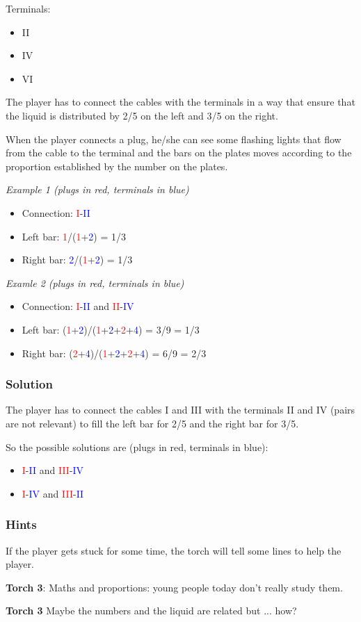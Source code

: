 Terminals:
\begin{itemize}
	\item II
	\item IV
	\item VI
\end{itemize}

The player has to connect the cables with the terminals in a way that ensure that the liquid is distributed by 2/5 on the left and 3/5 on the right.

When the player connects a plug, he/she can see some flashing lights that flow from the cable to the terminal and the bars on the plates moves according to the proportion established by the number on the plates.

\textit{Example 1 (plugs in red, terminals in blue)}
\begin{itemize}
	\item Connection: \textcolor{red}{I}-\textcolor{blue}{II}
	\item Left bar: \textcolor{red}{1}/(\textcolor{red}{1}+\textcolor{blue}{2}) = 1/3
	\item Right bar: \textcolor{blue}{2}/(\textcolor{red}{1}+\textcolor{blue}{2}) = 1/3
\end{itemize}

\textit{Examle 2 (plugs in red, terminals in blue)}
\begin{itemize}
	\item Connection: \textcolor{red}{I}-\textcolor{blue}{II} and \textcolor{red}{II}-\textcolor{blue}{IV}
	\item Left bar: (\textcolor{red}{1}+\textcolor{blue}{2})/(\textcolor{red}{1}+\textcolor{blue}{2}+\textcolor{red}{2}+\textcolor{blue}{4}) = 3/9 = 1/3
	\item Right bar: (\textcolor{red}{2}+\textcolor{blue}{4})/(\textcolor{red}{1}+\textcolor{blue}{2}+\textcolor{red}{2}+\textcolor{blue}{4}) = 6/9 = 2/3
\end{itemize}

\subsubsection*{Solution}
The player has to connect the cables I and III with the terminals II and IV (pairs are not relevant) to fill the left bar for 2/5 and the right bar for 3/5.

So the possible solutions are (plugs in red, terminals in blue):
\begin{itemize}
	\item \textcolor{red}{I}-\textcolor{blue}{II} and \textcolor{red}{III}-\textcolor{blue}{IV}
	\item \textcolor{red}{I}-\textcolor{blue}{IV} and \textcolor{red}{III}-\textcolor{blue}{II}
\end{itemize}

\subsubsection*{Hints}
If the player gets stuck for some time, the torch will tell some lines to help the player.

\textbf{Torch 3}: Maths and proportions: young people today don't really study them.

\textbf{Torch 3} Maybe the numbers and the liquid are related but ... how? 